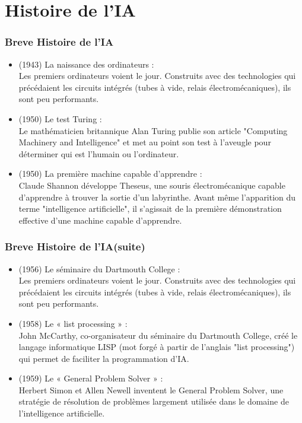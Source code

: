 \documentclass{beamer}
\begin{document}
	\section{Histoire de l'IA}
	\begin{frame}
	\frametitle{Breve Histoire de l'IA}
	\begin{itemize}
		\itemsep0.5em
		\item (1943) La naissance des ordinateurs :\\
		 Les premiers ordinateurs voient le jour. Construits avec des technologies qui précédaient les circuits intégrés (tubes à vide, relais électromécaniques), ils sont peu performants.
		 
		 \item (1950) Le test Turing : \\
		 Le mathématicien britannique Alan Turing publie son article "Computing Machinery and Intelligence" et met au point son test à l’aveugle pour déterminer qui est l’humain ou l’ordinateur.

		 \item (1950) La première machine capable d’apprendre :\\
		 Claude Shannon développe Theseus, une souris électromécanique capable d’apprendre à trouver la sortie d’un labyrinthe. Avant même l’apparition du terme "intelligence artificielle", il s’agissait de la première démonstration effective d’une machine capable d’apprendre.

	\end{itemize}
	\end{frame}
	
	\begin{frame}
	\frametitle{Breve Histoire de l'IA(suite)}
	\begin{itemize}
		\itemsep1em
		\item (1956) Le séminaire du Dartmouth College :\\
		 Les premiers ordinateurs voient le jour. Construits avec des technologies qui précédaient les circuits intégrés (tubes à vide, relais électromécaniques), ils sont peu performants.
		 
		 \item (1958) Le « list processing » : \\
		 John McCarthy, co-organisateur du séminaire du Dartmouth College, créé le langage informatique LISP (mot forgé à partir de l’anglais "list processing") qui permet de faciliter la programmation d’IA.

		 \item (1959) Le « General Problem Solver » :\\
		 Herbert Simon et Allen Newell inventent le General Problem Solver, une stratégie de résolution de problèmes largement utilisée dans le domaine de l'intelligence artificielle.

	\end{itemize}
	\end{frame}
	
\end{document}
